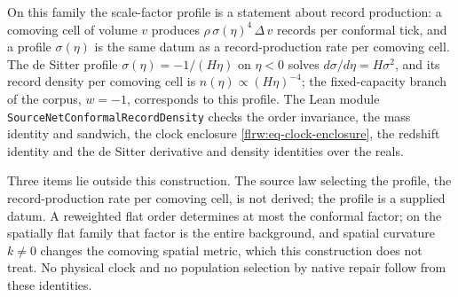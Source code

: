 \begin{remark}
\label{flrw:record-production}
On this family the scale-factor profile is a statement about record
production: a comoving cell of volume $v$ produces
$\rho\,\sigma(\eta)^4\,\Delta\,v$ records per conformal tick, and a profile
$\sigma(\eta)$ is the same datum as a record-production rate per comoving
cell. The de Sitter profile $\sigma(\eta)=-1/(H\eta)$ on $\eta<0$ solves
$d\sigma/d\eta=H\sigma^2$, and its record density per comoving cell is
$n(\eta)\propto(H\eta)^{-4}$; the fixed-capacity branch of the corpus,
$w=-1$, corresponds to this profile. The Lean module
\texttt{SourceNetConformalRecordDensity} checks the
order invariance, the mass identity and sandwich, the clock enclosure
\eqref{flrw:eq-clock-enclosure}, the redshift identity and the de Sitter
derivative and density identities over the reals.

Three items lie outside this construction. The source law selecting the
profile, the record-production rate per comoving cell, is not derived; the
profile is a supplied datum. A reweighted flat order determines at most the
conformal factor; on the spatially flat family that factor is the entire
background, and spatial curvature $k\neq0$ changes the comoving spatial
metric, which this construction does not treat. No physical clock and no
population selection by native repair follow from these identities.
\end{remark}
